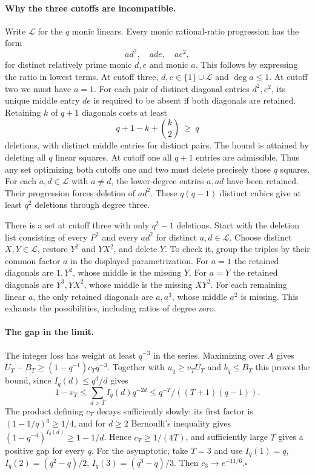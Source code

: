 \paragraph{Why the three cutoffs are incompatible.}
Write $\mathcal L$ for the $q$ monic linears. Every monic rational-ratio progression has the form
\[
                  a d^2,\quad a d e,\quad a e^2,
\]
for distinct relatively prime monic $d,e$ and monic $a$. This follows by expressing the ratio in lowest terms. At cutoff three, $d,e\in\{1\}\cup\mathcal L$ and $\deg a\le1$. At cutoff two we must have $a=1$. For each pair of distinct diagonal entries $d^2,e^2$, its unique middle entry $de$ is required to be absent if both diagonals are retained. Retaining $k$ of $q+1$ diagonals costs at least
\[
                  q+1-k+\binom{k}{2}\ \ge\ q
\]
deletions, with distinct middle entries for distinct pairs. The bound is attained by deleting all $q$ linear squares. At cutoff one all $q+1$ entries are admissible. Thus any set optimizing both cutoffs one and two must delete precisely those $q$ squares. For each $a,d\in\mathcal L$ with $a\ne d$, the lower-degree entries $a,ad$ have been retained. Their progression forces deletion of $ad^2$. These $q(q-1)$ distinct cubics give at least $q^2$ deletions through degree three.

There is a set at cutoff three with only $q^2-1$ deletions. Start with the deletion list consisting of every $P^2$ and every $ad^2$ for distinct $a,d\in\mathcal L$. Choose distinct $X,Y\in\mathcal L$, restore $Y^2$ and $YX^2$, and delete $Y$. To check it, group the triples by their common factor $a$ in the displayed parametrization. For $a=1$ the retained diagonals are $1,Y^2$, whose middle is the missing $Y$. For $a=Y$ the retained diagonals are $Y^3,YX^2$, whose middle is the missing $XY^2$. For each remaining linear $a$, the only retained diagonals are $a,a^3$, whose middle $a^2$ is missing. This exhausts the possibilities, including ratios of degree zero.

\paragraph{The gap in the limit.}
The integer loss has weight at least $q^{-3}$ in the series. Maximizing over $A$ gives $U_T-B_T\ge(1-q^{-1})c_Tq^{-3}$. Together with $u_q\ge v_T U_T$ and $b_q\le B_T$ this proves the bound, since $I_q(d)\le q^d/d$ gives
\[
 1-v_T\le\sum_{d>T} I_q(d)q^{-2d}
       \le q^{-T}/((T+1)(q-1)).
\]
The product defining $c_T$ decays sufficiently slowly: its first factor is $(1-1/q)^q\ge1/4$, and for $d\ge2$ Bernoulli's inequality gives $(1-q^{-d})^{I_q(d)}\ge1-1/d$. Hence $c_T\ge1/(4T)$, and sufficiently large $T$ gives a positive gap for every $q$. For the asymptotic, take $T=3$ and use $I_q(1)=q$, $I_q(2)=(q^2-q)/2$, $I_q(3)=(q^3-q)/3$. Then $c_3\to e^{-11/6}$.\hfill$\square$

